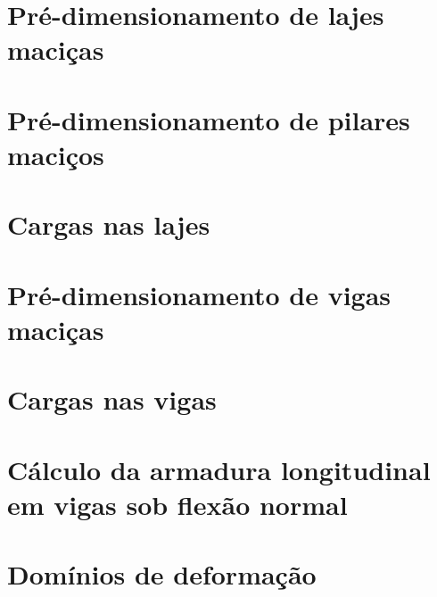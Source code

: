 \documentclass[12pt, a4paper]{article}
\begin{document}
	

	\section{Pré-dimensionamento de lajes maciças}
	

	\section{Pré-dimensionamento de pilares maciços}
	

	\section{Cargas nas lajes}
		

	\section{Pré-dimensionamento de vigas maciças}
	

	\section{Cargas nas vigas}
	

	\section{Cálculo da armadura longitudinal em vigas sob flexão normal}
	

	\section{Domínios de deformação}
	
\end{document}
